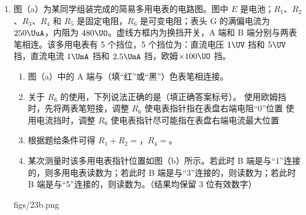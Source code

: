 \documentclass[\gkver]{gaokaozhenti}
\begin{document}
\begin{enumerate}
{\begin{enumerate}
	\item
	（i）如图所示。（ii）4.0，0.05

\end{enumerate}
}

\item
图（a）为某同学组装完成的简易多用电表的电路图。图中 $E$ 是电池；$R_{1}$、$R_{2}$、$R_{3}$、$R_{4}$ 和 $R_{5}$ 是固定电阻，$R_{6}$ 是可变电阻；表头 G 的满偏电流为 $250\UuA$，内阻为 $480\UO$。虚线方框内为换挡开关，A 端和 B 端分别与两表笔相连。该多用电表有 5 个挡位，5 个挡位为：直流电压 $1\UV$ 挡和 $5\UV$ 挡，直流电流 $1\UmA$ 挡和 $2.5\UmA$ 挡，欧姆$\times 100\UO$ 挡。
\begin{enumerate}
	\item
	图（a）中的 A 端与（填“红”或“黑”）色表笔相连接。
	\item
	关于 $R_{6}$ 的使用，下列说法正确的是（填正确答案标号）。
	{使用欧姆挡时，先将两表笔短接，调整 $R_{6}$ 使电表指针指在表盘右端电阻“0”位置}
	{使用电流挡时，调整 $R_{6}$ 使电表指针尽可能指在表盘右端电流最大位置}
	\item
	根据题给条件可得 $R_{1}+R_{2}=$\tkanswer[1.5cm]{$160\UO$}，$R_{4}=$\tkanswer[1.5cm]{$880\UO$}。
	\item
	某次测量时该多用电表指针位置如图（b）所示。若此时 B 端是与“1”连接的，则多用电表读数为\tkanswer[2cm]{$1.47\UmA$}；若此时 B 端是与“3”连接的，则读数为；若此时 B 端是与“5”连接的，则读数为\tkanswer[2cm]{$2.95\UV$}。（结果均保留 3 位有效数字）
\end{enumerate}
{figs/23b.png}


\end{enumerate}
\end{document}

